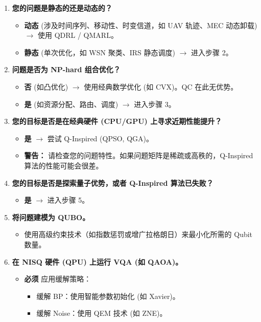 \documentclass[11pt,a4paper]{article}
\begin{document}
\begin{enumerate}
\item \textbf{您的问题是静态的还是动态的？}
\begin{itemize}
\item \textbf{动态} (涉及时间序列、移动性、时变信道，如 UAV 轨迹、MEC 动态卸载) $\rightarrow$ 使用 QDRL / QMARL。
\item \textbf{静态} (单次优化，如 WSN 聚类、IRS 静态调度) $\rightarrow$ 进入步骤 2。
\end{itemize}

\item \textbf{问题是否为 NP-hard 组合优化？}
\begin{itemize}
\item \textbf{否} (如凸优化) $\rightarrow$ 使用经典数学优化 (如 CVX)。QC 在此无优势。
\item \textbf{是} (如资源分配、路由、调度) $\rightarrow$ 进入步骤 3。
\end{itemize}

\item \textbf{您的目标是否是在经典硬件 (CPU/GPU) 上寻求近期性能提升？}
\begin{itemize}
\item \textbf{是} $\rightarrow$ 尝试 Q-Inspired (QPSO, QGA)。
\item \textbf{警告：} 请检查您的问题特性。如果问题矩阵是稀疏或高秩的，Q-Inspired 算法的性能可能会很差。
\end{itemize}

\item \textbf{您的目标是否是探索量子优势，或者 Q-Inspired 算法已失败？}
\begin{itemize}
\item \textbf{是} $\rightarrow$ 进入步骤 5。
\end{itemize}

\item \textbf{将问题建模为 QUBO。}
\begin{itemize}
\item 使用高级约束技术（如指数惩罚或增广拉格朗日）来最小化所需的 Qubit 数量。
\end{itemize}

\item \textbf{在 NISQ 硬件 (QPU) 上运行 VQA (如 QAOA)。}
\begin{itemize}
\item \textbf{必须} 应用缓解策略：
\begin{itemize}
\item 缓解 BP：使用智能参数初始化 (如 Xavier)。
\item 缓解 Noise：使用 QEM 技术 (如 ZNE)。
\end{itemize}
\end{itemize}
\end{enumerate}
\end{document}
